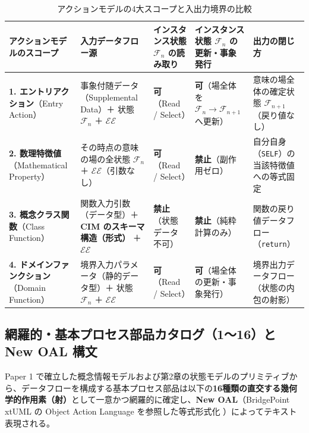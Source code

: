 \documentclass[11pt,a4paper]{ltjsarticle}
\theoremstyle{definition}
\theoremstyle{plain}
\theoremstyle{remark}
\begin{document}
\begin{table}[htbp]
\centering
\caption{アクションモデルの4大スコープと入出力境界の比較}
\label{tab:action-scopes}
\small
\begin{tabular}{>{\raggedright\arraybackslash}p{3.0cm} >{\raggedright\arraybackslash}p{3.7cm} >{\raggedright\arraybackslash}p{2.3cm} >{\raggedright\arraybackslash}p{2.8cm} >{\raggedright\arraybackslash}p{3.0cm}}
\toprule
\textbf{アクションモデルのスコープ} & \textbf{入力データフロー源} & \textbf{インスタンス状態 $\mathcal{F}_n$ の読み取り} & \textbf{インスタンス状態 $\mathcal{F}_n$ の更新・事象発行} & \textbf{出力の閉じ方} \\
\midrule
\textbf{1. エントリアクション}（Entry Action） & 事象付随データ（Supplemental Data）＋ 状態 $\mathcal{F}_n$ ＋ $\mathcal{EE}$ & \textbf{可}（Read / Select） & \textbf{可}（場全体を $\mathcal{F}_n \to \mathcal{F}_{n+1}$ へ更新） & 意味の場全体の確定状態 $\mathcal{F}_{n+1}$（戻り値なし） \\
\addlinespace
\textbf{2. 数理特徴値}（Mathematical Property） & その時点の意味の場の全状態 $\mathcal{F}_n$ ＋ $\mathcal{EE}$（引数なし） & \textbf{可}（Read / Select） & \textbf{禁止}（副作用ゼロ） & 自分自身（\texttt{SELF}）の当該特徴値への等式固定 \\
\addlinespace
\textbf{3. 概念クラス関数}（Class Function） & 関数入力引数（データ型）＋ \textbf{CIM のスキーマ構造（形式）} ＋ $\mathcal{EE}$ & \textbf{禁止}（状態データ不可） & \textbf{禁止}（純粋計算のみ） & 関数の戻り値データフロー（\texttt{return}） \\
\addlinespace
\textbf{4. ドメインファンクション}（Domain Function） & 境界入力パラメータ（静的データ型）＋ 状態 $\mathcal{F}_n$ ＋ $\mathcal{EE}$ & \textbf{可}（Read / Select） & \textbf{可}（場全体の更新・事象発行） & 境界出力データフロー（状態の内包の射影） \\
\bottomrule
\end{tabular}
\end{table}
\subsection{網羅的・基本プロセス部品カタログ（1〜16）と New OAL 構文}
Paper 1 で確立した概念情報モデルおよび第2章の状態モデルのプリミティブから、データフローを構成する基本プロセス部品は以下の\textbf{16種類の直交する幾何学的作用素（射）}として一意かつ網羅的に確定し、\textbf{New OAL}（BridgePoint xtUML の Object Action Language を参照した等式形式化 \cite{mellor2002,xtumlorg}）によってテキスト表現される。
\end{document}

